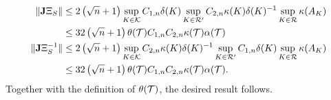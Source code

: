 \documentclass[10pt,a4paper]{article}
\begin{document}
\begin{itemize}
\begin{align*}
            \| {\mathbf{J}} \Xi_{S} \| 
            &\leq 
            2 \left( \sqrt{n} + 1 \right) 
            \sup_{ K \in {\mathcal K}  }
            C_{1,n} {\delta}(K) 
            \sup_{ K \in {\mathcal R}' } 
            C_{2,n} \kappa(K) {\delta}(K)^{-1}
            \sup_{ K \in {\mathcal R}  } \kappa(A_{K})
            \\&\leq 
            32 \left( \sqrt{n} + 1 \right) 
            \theta({\mathcal T})
            C_{1,n} 
            C_{2,n} 
            \kappa({\mathcal T}) 
            \alpha({\mathcal T})
            \\
            \| {\mathbf{J}} \Xi_{S}^{-1} \| 
            &\leq 
            2 \left( \sqrt{n} + 1 \right) 
            \sup_{ K \in {\mathcal K}  }
            C_{2,n} \kappa(K) {\delta}(K)^{-1}
            \sup_{ K \in {\mathcal R}' } 
            C_{1,n} {\delta}(K)
            \sup_{ K \in {\mathcal R}  } \kappa(A_{K})
            \\
            &\leq 
            32 \left( \sqrt{n} + 1 \right) 
            \theta({\mathcal T})
            C_{1,n} 
            C_{2,n} 
            \kappa({\mathcal T}) 
            \alpha({\mathcal T})
            .
        \end{align*}
        Together with the definition of $\theta({\mathcal T})$, the desired result follows. 

\end{itemize}
\end{document}
